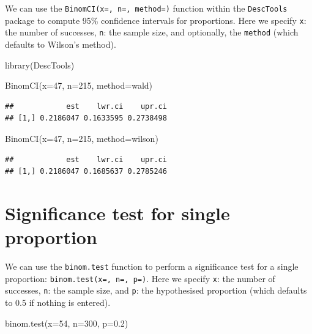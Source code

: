 \documentclass[
]{memoir}
\newenvironment{Shaded}{\begin{snugshade}}{\end{snugshade}}
\newcommand{\AttributeTok}[1]{\textcolor[rgb]{0.77,0.63,0.00}{#1}}
\newcommand{\DecValTok}[1]{\textcolor[rgb]{0.00,0.00,0.81}{#1}}
\newcommand{\FloatTok}[1]{\textcolor[rgb]{0.00,0.00,0.81}{#1}}
\newcommand{\FunctionTok}[1]{\textcolor[rgb]{0.00,0.00,0.00}{#1}}
\newcommand{\NormalTok}[1]{#1}
\newcommand{\StringTok}[1]{\textcolor[rgb]{0.31,0.60,0.02}{#1}}
\begin{document}
We can use the \texttt{BinomCI(x=,\ n=,\ method=)} function within the \texttt{DescTools} package to compute 95\% confidence intervals for proportions. Here we specify \texttt{x}: the number of successes, \texttt{n}: the sample size, and optionally, the \texttt{method} (which defaults to Wilson's method).

\begin{Shaded}
\begin{Highlighting}[]
\FunctionTok{library}\NormalTok{(DescTools)}

\FunctionTok{BinomCI}\NormalTok{(}\AttributeTok{x=}\DecValTok{47}\NormalTok{, }\AttributeTok{n=}\DecValTok{215}\NormalTok{, }\AttributeTok{method=}\StringTok{\textquotesingle{}wald\textquotesingle{}}\NormalTok{)}
\end{Highlighting}
\end{Shaded}

\begin{verbatim}
##            est    lwr.ci    upr.ci
## [1,] 0.2186047 0.1633595 0.2738498
\end{verbatim}

\begin{Shaded}
\begin{Highlighting}[]
\FunctionTok{BinomCI}\NormalTok{(}\AttributeTok{x=}\DecValTok{47}\NormalTok{, }\AttributeTok{n=}\DecValTok{215}\NormalTok{, }\AttributeTok{method=}\StringTok{\textquotesingle{}wilson\textquotesingle{}}\NormalTok{)}
\end{Highlighting}
\end{Shaded}

\begin{verbatim}
##            est    lwr.ci    upr.ci
## [1,] 0.2186047 0.1685637 0.2785246
\end{verbatim}

\hypertarget{significance-test-for-single-proportion}{%
\section{Significance test for single proportion}\label{significance-test-for-single-proportion}}

We can use the \texttt{binom.test} function to perform a significance test for a single proportion: \texttt{binom.test(x=,\ n=,\ p=)}. Here we specify \texttt{x}: the number of successes, \texttt{n}: the sample size, and \texttt{p}: the hypothesised proportion (which defaults to 0.5 if nothing is entered).

\begin{Shaded}
\begin{Highlighting}[]
\FunctionTok{binom.test}\NormalTok{(}\AttributeTok{x=}\DecValTok{54}\NormalTok{, }\AttributeTok{n=}\DecValTok{300}\NormalTok{, }\AttributeTok{p=}\FloatTok{0.2}\NormalTok{)}
\end{Highlighting}
\end{Shaded}
\end{document}
